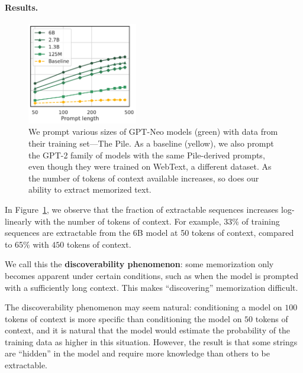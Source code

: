\paragraph{Results.}
\begin{figure}[h]
        \centering
        \includegraphics[height=12em]{figures/exactly_mem-vs-prompt_len-seq-500-gen-50-xlabel-markers.pdf} %
        \caption{
        We prompt various sizes of GPT-Neo models (green) with data from their training set---The Pile. 
    As a baseline (yellow), we also prompt the GPT-2 family of models with the same Pile-derived prompts, even though they were trained on WebText, a different dataset.
    As the number of tokens of context available increases, so does our ability to extract memorized text.
    }
        \label{fig:main-res-context}
\end{figure}

In Figure~\ref{fig:main-res-context}, we observe that the fraction of extractable sequences increases log-linearly with the number of tokens of context. For example, 33\% of training sequences are extractable from the 6B model at 50 tokens of context, compared to 65\% with $450$ tokens of context.

We call this the \textbf{discoverability phenomenon}:
some memorization only becomes apparent under certain conditions, such as when the model is prompted with a sufficiently long context.
This makes ``discovering'' memorization difficult.

%

The discoverability phenomenon may seem natural: conditioning a model on $100$ tokens of context is more specific than conditioning the model on $50$ tokens of context, and it is natural that the model would estimate the probability of the training data as higher in this situation. 
However, the result is that some strings are ``hidden'' in the model and require more knowledge than others to be extractable.

